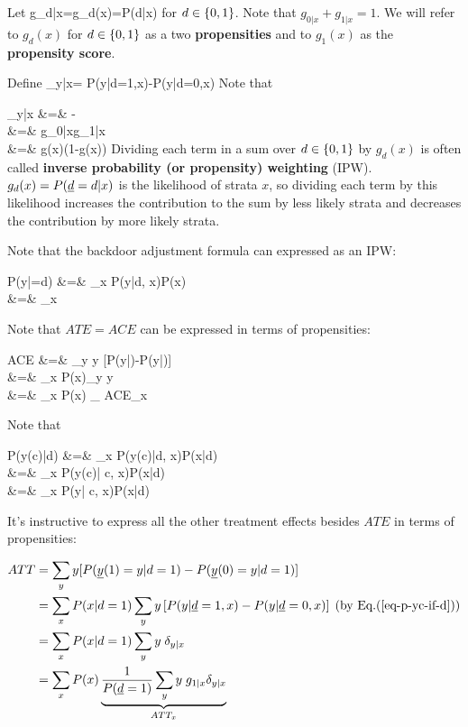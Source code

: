 Let
\beq
g_{d|x}=g_d(x)=P(d|x)
\eeq
 for $d\in\{0,1\}$.
Note that $g_{0|x}+g_{1|x}=1$.
We will
refer to $g_d(x)$
for $d\in \{0,1\}$
as a two {\bf propensities}
and to $g_1(x)$ as the
{\bf propensity score}.

Define
\beq
\delta_{y|x}=
P(y|d=1,x)-P(y|d=0,x)
\eeq
Note that

\beqa
\delta_{y|x}
&=&
-
\\
&=&
{
g_{0|x}g_{1|x}
}
\\
&=&
{
g(x)(1-g(x))
}
\eeqa
Dividing
each term
in a sum over $d\in \{0,1\}$
by $g_ d(x)$
is often called
 {\bf inverse probability (or propensity)
weighting} (IPW).
$g_ d(x)=P(\rvd= d|x)$ is the
likelihood of strata $x$,
so dividing each term by
this likelihood increases the
contribution to the sum
by less likely strata
and decreases the contribution by
more likely strata.




Note that the
backdoor adjustment formula
can  expressed
as an IPW:



\beqa
P(y|\cald\rvd=d)
&=&
\sum_x P(y|d, x)P(x)
\\
&=&
\sum_x 
\eeqa

Note that $ATE=ACE$ can be expressed
in terms of propensities:



\beqa
ACE
&=&
\sum_y y [P(y|\cald{})-P(y|\cald{})]
\\
&=&
\sum_x P(x)\sum_y y
\left[
P(y|d=1,x)
-
P(y|d=0,x)
\right]
\\&=&
\sum_x P(x)
_
{ACE_x}
\label{eq-ace-propensity}
\eeqa



Note that

\beqa
P(y(c)|d)
&=&
\sum_x P(y(c)|d, x)P(x|d)
\\
&=&
\sum_x P(y(c)| c, x)P(x|d) \;
\\
&=&
\sum_x P(y| c, x)P(x|d)\;
\label{eq-p-yc-if-d}
\eeqa

It's
instructive
to express all the
other treatment effects besides
$ATE$ in terms of propensities:

\begin{align}
ATT
&=
 \sum_y y [P(\rvy(1)=y|d=1)
-P(\rvy(0)=y|d=1)]
\\
&=
\sum_x P(x|d=1)
\sum_y y
\left[
P(y|\rvd=1,x)
-
P(y|\rvd=0,x)
\right]
\;\text{(by Eq.(\ref{eq-p-yc-if-d}))}
\\
&=
\sum_x P(x|d=1)
\sum_y y \;\delta_{y|x}
\\
&=
\sum_x P(x)
\underbrace{
\frac{1}{P(\rvd=1)}
\sum_y y\; g_{1|x}\delta_{y|x}
}_
{ATT_x}
\end{align}

